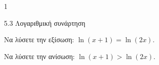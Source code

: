 \begin{ylh}{1}
\item 5.3 Λογαριθμική συνάρτηση
\end{ylh}
\begin{alist}
\item Να λύσετε την εξίσωση: $\ln(x + 1) = \ln(2x)$.
\item Να λύσετε την ανίσωση: $\ln(x + 1) > \ln(2x)$.
\end{alist}

